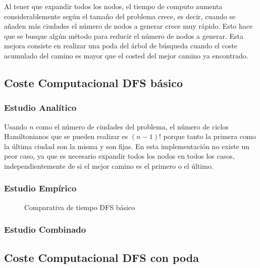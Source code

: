 \documentclass{uc3mpracticas}
\begin{document}
  \vspace{2mm} %
  
  Al tener que expandir todos los nodos, el tiempo de computo aumenta considerablemente según el tamaño del problema crece, es decir, cuando se añaden más ciudades el número de nodos a generar crece muy rápido. Esto hace que se busque algún método para reducir el número de nodos a generar. Esta mejora consiste en realizar una poda del árbol de búsqueda cuando el coste acumulado del camino es mayor que el costed del mejor camino ya encontrado.



  \subsection{Coste Computacional DFS básico}

  \subsubsection{Estudio Analítico}

  Usando $n$ como el número de ciudades del problema, el número de ciclos Hamiltonianos que se pueden realizar es $(n-1)!$ porque tanto la primera como la última ciudad son la misma y son fijas. En esta implementación no existe un peor caso, ya que es necesario expandir todos los nodos en todos los casos, independientemente de si el mejor camino es el primero o el último.

  \vspace{2mm}


  
  \subsubsection{Estudio Empírico}
  
  \begin{figure}[!h]
    \caption{Comparativa de tiempo DFS básico}
  \end{figure}
  
  \newpage

  \subsubsection{Estudio Combinado}

  \subsection{Coste Computacional DFS con poda}
\end{document}
